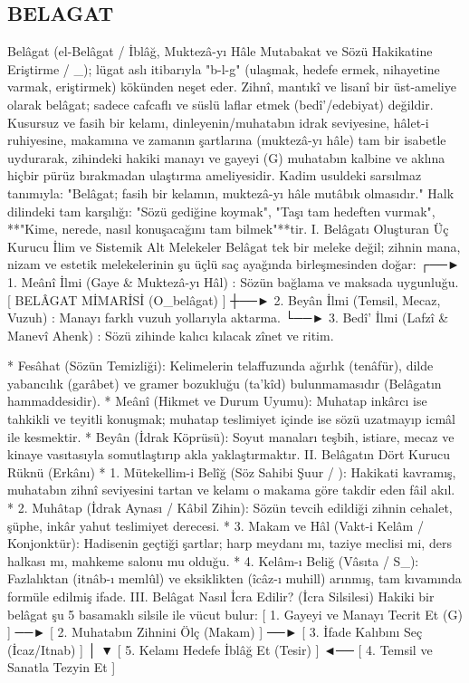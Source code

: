 \documentclass[11pt,a4paper]{article}
\begin{document}
\subsection{BELAGAT}




Belâgat (el-Belâgat / İblâğ, Muktezâ-yı Hâle Mutabakat ve Sözü Hakikatine Eriştirme / _{}); lügat aslı itibarıyla "b-l-g" (ulaşmak, hedefe ermek, nihayetine varmak, eriştirmek) kökünden neşet eder.
Zihnî, mantıkî ve lisanî bir üst-ameliye olarak belâgat; sadece cafcaflı ve süslü laflar etmek (bedî'/edebiyat) değildir. Kusursuz ve fasih bir kelamı, dinleyenin/muhatabın idrak seviyesine, hâlet-i ruhiyesine, makamına ve zamanın şartlarına (muktezâ-yı hâle) tam bir isabetle uydurarak, zihindeki hakiki manayı ve gayeyi (G) muhatabın kalbine ve aklına hiçbir pürüz bırakmadan ulaştırma ameliyesidir.
Kadim usuldeki sarsılmaz tanımıyla: "Belâgat; fasih bir kelamın, muktezâ-yı hâle mutâbık olmasıdır."
Halk dilindeki tam karşılığı: "Sözü gediğine koymak", "Taşı tam hedeften vurmak", **"Kime, nerede, nasıl konuşacağını tam bilmek"**tir.
I. Belâgatı Oluşturan Üç Kurucu İlim ve Sistemik Alt Melekeler
Belâgat tek bir meleke değil; zihnin mana, nizam ve estetik melekelerinin şu üçlü saç ayağında birleşmesinden doğar:
                                 ┌──► 1. Meânî İlmi (Gaye & Muktezâ-yı Hâl) : Sözün bağlama ve maksada uygunluğu.
[ BELÂGAT MİMARİSİ (O_belâgat) ] ┼──► 2. Beyân İlmi (Temsil, Mecaz, Vuzuh)   : Manayı farklı vuzuh yollarıyla aktarma.
                                 └──► 3. Bedî' İlmi (Lafzî & Manevî Ahenk)  : Sözü zihinde kalıcı kılacak zînet ve ritim.

 * Fesâhat (Sözün Temizliği): Kelimelerin telaffuzunda ağırlık (tenâfür), dilde yabancılık (garâbet) ve gramer bozukluğu (ta'kîd) bulunmamasıdır (Belâgatın hammaddesidir).
 * Meânî (Hikmet ve Durum Uyumu): Muhatap inkârcı ise tahkikli ve teyitli konuşmak; muhatap teslimiyet içinde ise sözü uzatmayıp icmâl ile kesmektir.
 * Beyân (İdrak Köprüsü): Soyut manaları teşbih, istiare, mecaz ve kinaye vasıtasıyla somutlaştırıp akla yaklaştırmaktır.
II. Belâgatın Dört Kurucu Rüknü (Erkânı)
 * 1. Mütekellim-i Belîğ (Söz Sahibi Şuur / ): Hakikati kavramış, muhatabın zihnî seviyesini tartan ve kelamı o makama göre takdir eden fâil akıl.
 * 2. Muhâtap (İdrak Aynası / Kâbil Zihin): Sözün tevcih edildiği zihnin cehalet, şüphe, inkâr yahut teslimiyet derecesi.
 * 3. Makam ve Hâl (Vakt-i Kelâm / Konjonktür): Hadisenin geçtiği şartlar; harp meydanı mı, taziye meclisi mi, ders halkası mı, mahkeme salonu mu olduğu.
 * 4. Kelâm-ı Beliğ (Vâsıta / S_{}): Fazlalıktan (itnâb-ı memlûl) ve eksiklikten (îcâz-ı muhill) arınmış, tam kıvamında formüle edilmiş ifade.
III. Belâgat Nasıl İcra Edilir? (İcra Silsilesi)
Hakiki bir belâgat şu 5 basamaklı silsile ile vücut bulur:
[ 1. Gayeyi ve Manayı Tecrit Et (G) ] ──► [ 2. Muhatabın Zihnini Ölç (Makam) ] ──► [ 3. İfade Kalıbını Seç (İcaz/Itnab) ]
                                                                                               │
                                                                                               ▼
[ 5. Kelamı Hedefe İblâğ Et (Tesir) ] ◄── [ 4. Temsil ve Sanatla Tezyin Et ]
\end{document}
